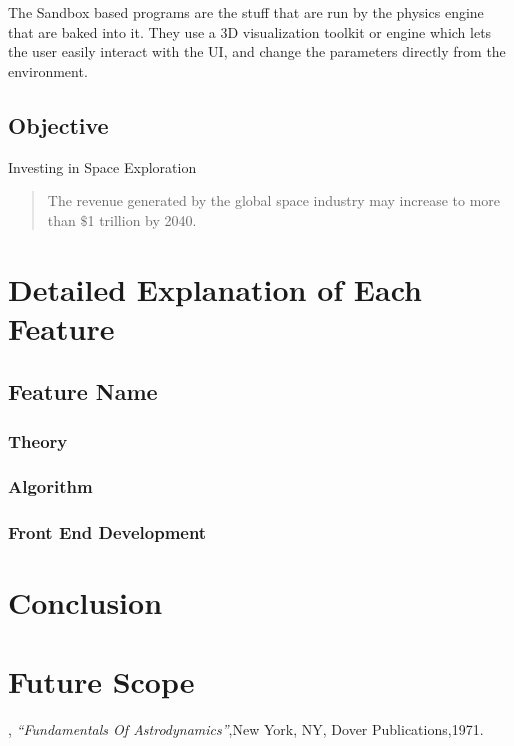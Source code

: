 \documentclass[12pt]{article}
\begin{document}
The Sandbox based programs are the stuff that are run by the physics engine that are baked into it. They use a 3D visualization toolkit or engine which lets the user easily interact with the UI, and change the parameters directly from the environment.
\subsection{Objective}
Investing in Space Exploration
\begin{framed}
\begin{quote}
The revenue generated by the global space industry may increase to more than $\$$1 trillion by 2040.
\end{quote}
\end{framed}
\section{Detailed Explanation of Each Feature}
\subsection{Feature Name}
\subsubsection{Theory}
\subsubsection{Algorithm}
\subsubsection{Front End Development}
\section{Conclusion}
\section{Future Scope}

\begin{thebibliography}{99}
	,{ \textit{\enquote{Fundamentals Of Astrodynamics}}},{New York, NY},{ Dover Publications},{1971}.
	

\end{thebibliography}
\end{document}
